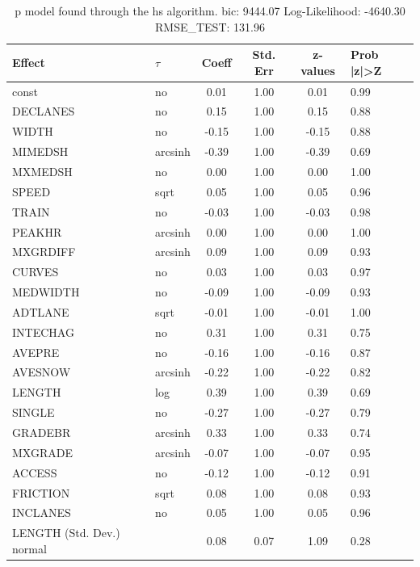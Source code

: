 \begin{table}
	\caption{p model found through the hs algorithm. bic: 9444.07 Log-Likelihood: -4640.30 RMSE_TEST: 131.96}
	\begin{center}
		\begin{tabular}{|l|l|c|c|c|l|}
			\hline
			Effect & $\tau$ & Coeff & Std. Err & z-values & Prob |z|>Z \\
			\hline
			const & no & 0.01 & 1.00 & 0.01 & 0.99 \\
			\hline
			DECLANES & no & 0.15 & 1.00 & 0.15 & 0.88 \\
			\hline
			WIDTH & no & -0.15 & 1.00 & -0.15 & 0.88 \\
			\hline
			MIMEDSH & arcsinh & -0.39 & 1.00 & -0.39 & 0.69 \\
			\hline
			MXMEDSH & no & 0.00 & 1.00 & 0.00 & 1.00 \\
			\hline
			SPEED & sqrt & 0.05 & 1.00 & 0.05 & 0.96 \\
			\hline
			TRAIN & no & -0.03 & 1.00 & -0.03 & 0.98 \\
			\hline
			PEAKHR & arcsinh & 0.00 & 1.00 & 0.00 & 1.00 \\
			\hline
			MXGRDIFF & arcsinh & 0.09 & 1.00 & 0.09 & 0.93 \\
			\hline
			CURVES & no & 0.03 & 1.00 & 0.03 & 0.97 \\
			\hline
			MEDWIDTH & no & -0.09 & 1.00 & -0.09 & 0.93 \\
			\hline
			ADTLANE & sqrt & -0.01 & 1.00 & -0.01 & 1.00 \\
			\hline
			INTECHAG & no & 0.31 & 1.00 & 0.31 & 0.75 \\
			\hline
			AVEPRE & no & -0.16 & 1.00 & -0.16 & 0.87 \\
			\hline
			AVESNOW & arcsinh & -0.22 & 1.00 & -0.22 & 0.82 \\
			\hline
			LENGTH & log & 0.39 & 1.00 & 0.39 & 0.69 \\
			\hline
			SINGLE & no & -0.27 & 1.00 & -0.27 & 0.79 \\
			\hline
			GRADEBR & arcsinh & 0.33 & 1.00 & 0.33 & 0.74 \\
			\hline
			MXGRADE & arcsinh & -0.07 & 1.00 & -0.07 & 0.95 \\
			\hline
			ACCESS & no & -0.12 & 1.00 & -0.12 & 0.91 \\
			\hline
			FRICTION & sqrt & 0.08 & 1.00 & 0.08 & 0.93 \\
			\hline
			INCLANES & no & 0.05 & 1.00 & 0.05 & 0.96 \\
			\hline
			LENGTH (Std. Dev.) normal &  & 0.08 & 0.07 & 1.09 & 0.28 \\

\end{tabular}
\end{center}
\end{table}
